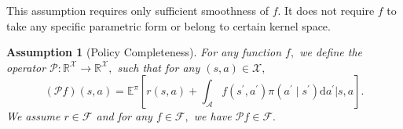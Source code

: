\documentclass{article}
\numberwithin{equation}{section}
\theoremstyle{plain}
\theoremstyle{definition}
\newtheorem{assumption}[theorem]{Assumption}
\theoremstyle{remark}
\newtheorem{remark}[theorem]{Remark}
\begin{document}
This assumption requires only sufficient smoothness of $f$. It does not require $f$ to take any specific parametric form or belong to certain kernel space.  

\begin{assumption}[Policy Completeness]\label{assumption_completeness}
\it
    For any function $f,$ we define the operator $\mathcal{P}: \mathbb{R}^{\mathcal{X}} \to \mathbb{R}^{\mathcal{X}},$ such that for any $(s,a) \in \mathcal{X},$
    \begin{equation}\label{definition_P}
        \left(\mathcal{P} f\right)(s,a) = \mathbb{E}^{\pi}\left[r(s,a) + \int_{\mathcal{A}} f(s^{\prime},a^{\prime}) \pi(a^{\prime} \mid s^{\prime}) \mathrm{d} a^{\prime} \Bigg\vert s,a\right].
    \end{equation}
We assume $r\in \mathcal{F}$ and for any $f \in \mathcal{F}, $ we have $\mathcal{P}f \in \mathcal{F}.$ 
\end{assumption}

\end{document}
